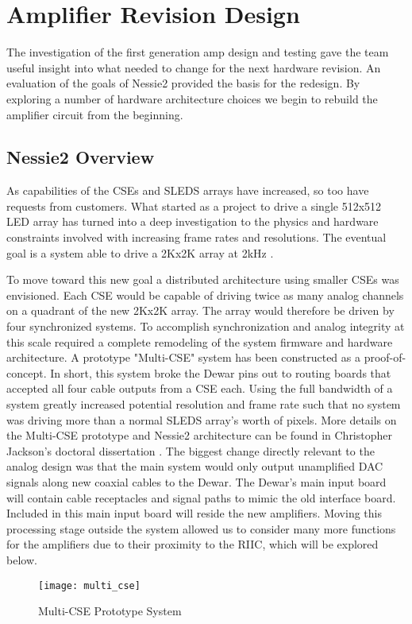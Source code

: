 %
%
\chapter{Amplifier Revision Design}
The investigation of the first generation amp design and testing gave the team useful insight into what needed to change for the next hardware revision. An evaluation of the goals of Nessie2 provided the basis for the redesign. By exploring a number of hardware architecture choices we begin to rebuild the amplifier circuit from the beginning.
\section{Nessie2 Overview}
As capabilities of the CSEs and SLEDS arrays have increased, so too have requests from customers. What started as a project to drive a single 512x512 LED array has turned into a deep investigation to the physics and hardware constraints involved with increasing frame rates and resolutions. The eventual goal is a system able to drive a 2Kx2K array at 2kHz \cite{chris}.\par To move toward this new goal a distributed architecture using smaller CSEs was envisioned. Each CSE would be capable of driving twice as many analog channels on a quadrant of the new 2Kx2K array. The array would therefore be driven by four synchronized systems. To accomplish synchronization and analog integrity at this scale required a complete remodeling of the system firmware and hardware architecture. A prototype "Multi-CSE" system has been constructed as a proof-of-concept. In short, this system broke the Dewar pins out to routing boards that accepted all four cable outputs from a CSE each. Using the full bandwidth of a system greatly increased potential resolution and frame rate such that no system was driving more than a normal SLEDS array's worth of pixels. More details on the Multi-CSE prototype and Nessie2 architecture can be found in Christopher Jackson's doctoral dissertation \cite{chris}. The biggest change directly relevant to the analog design was that the main system would only output unamplified DAC signals along new coaxial cables to the Dewar. The Dewar's main input board will contain cable receptacles and signal paths to mimic the old interface board. Included in this main input board will reside the new amplifiers. Moving this processing stage outside the system allowed us to consider many more functions for the amplifiers due to their proximity to the RIIC, which will be explored below.
\FloatBarrier
\begin{figure}[!htb]
	\centering
	\texttt{[image: multi\_cse]}
	\caption{Multi-CSE Prototype System \cite{chris}}
\end{figure}

